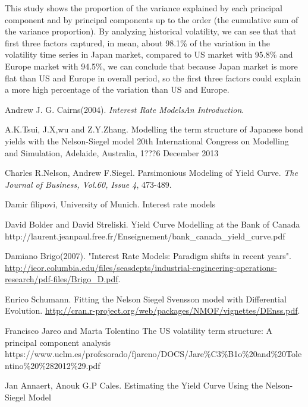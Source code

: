 \documentclass{article}
\begin{document}
\begin{spacing}{1.5}
This study shows the proportion of the variance explained by each principal component and by principal components up to the order (the cumulative sum of the variance proportion). By analyzing historical volatility, we can see that that first three factors captured, in mean, about 98.1\% of the variation in the volatility time series in Japan market, compared to US market with 95.8\% and Europe market with 94.5\%, we can conclude that because Japan market is more flat than US and Europe in overall period, so the first three factors could explain a more high percentage of the variation than US and Europe.

\end{spacing}
\begin{thebibliography}{99}
  Andrew J. G. Cairns(2004).
 \newblock \emph{Interest Rate Models\textendash An Introduction}.

\bibitem{} A.K.Tsui, J.X,wu and Z.Y.Zhang.
 \newblock Modelling the term structure of Japanese bond yields with the Nelson-Siegel model
 \newblock 20th International Congress on Modelling and Simulation, Adelaide, Australia, 1???6 December 2013
 
 \bibitem{} Charles R.Nelson, Andrew F.Siegel. 
 \newblock Parsimonious Modeling of Yield Curve.
 \newblock \textit{The Journal of Business, Vol.60, Issue 4}, 473-489.

\bibitem{} Damir filipovi, University of Munich.
 \newblock Interest rate models
 
 \bibitem{} David Bolder and David Streliski.
 \newblock Yield Curve Modelling at the Bank of Canada 
 \newblock http://laurent.jeanpaul.free.fr/Enseignement/bank_canada_yield_curve.pdf
 
 \bibitem{}Damiano Brigo(2007).
 \newblock "Interest Rate Models: Paradigm shifts in recent years".
 \newblock \url{http://ieor.columbia.edu/files/seasdepts/industrial-engineering-operations-research/pdf-files/Brigo_D.pdf}.
 
 \bibitem{} Enrico Schumann.
 \newblock Fitting the Nelson Siegel Svensson model with Differential Evolution.
 \newblock \url{http://cran.r-project.org/web/packages/NMOF/vignettes/DEnss.pdf}.
 
 \bibitem{} Francisco Jareo and Marta Tolentino
 \newblock The US volatility term structure: A principal component analysis
 \newblock https://www.uclm.es/profesorado/fjareno/DOCS/Jare\%C3\%B1o\%20and\%20Tolentino\%20\%282012\%29.pdf
 
 \bibitem{} Jan Annaert, Anouk G.P Cales.  Estimating the Yield Curve Using the Nelson-Siegel Model


\end{thebibliography}
\end{document}
